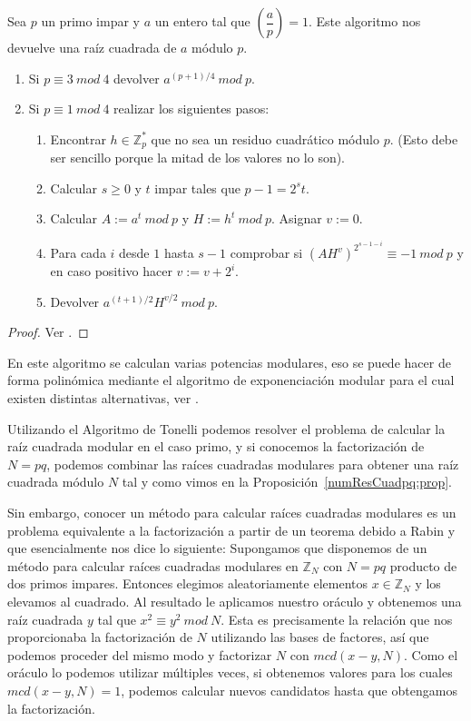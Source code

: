 \begin{algorithm}[Tonelli]
\label{algoTonelli}
Sea $p$ un primo impar y $a$ un entero tal que $\left( \dfrac{a}{p} \right) = 1$.
Este algoritmo nos devuelve una ra\'iz cuadrada de $a$ m\'odulo $p$.
\begin{enumerate}
\item Si $p \equiv 3 ~mod~4$ devolver $a^{(p+1)/4}~mod~p$.
\item Si $p \equiv 1 ~mod~4$ realizar los siguientes pasos:
\begin{enumerate}
\item Encontrar $h \in {\mathbb Z}_p^*$ que no sea un residuo cuadr\'atico m\'odulo $p$. (Esto debe ser sencillo porque la mitad de los valores no lo son).
\item Calcular $s \geq 0$ y $t$ impar tales que $p-1 = 2^s t$.
\item Calcular $A := a^t ~mod~p$ y $H:=h^t~mod~p$. Asignar $v:=0$.
\item Para cada $i$ desde $1$ hasta $s-1$ comprobar si $(AH^v)^{2^{s-1-i}} \equiv -1 ~mod~p$ y en caso positivo hacer $v := v + 2^i$.
\item Devolver $a^{(t+1)/2} H^{v/2} ~mod~p$.
\end{enumerate}
\end{enumerate}
\end{algorithm}
\begin{proof}
Ver \cite[Proposition 2.16]{Pardo}.
\end{proof}

En este algoritmo se calculan varias potencias modulares, eso se puede hacer de forma
polin\'omica mediante el algoritmo de exponenciaci\'on modular para el cual existen
distintas alternativas, ver \cite[Section 2.7.2]{Pardo}.

Utilizando el Algoritmo de Tonelli podemos resolver el problema de calcular
la ra\'iz cuadrada modular en el caso primo, y si conocemos la factorizaci\'on
de $N = pq$, podemos combinar las ra\'ices cuadradas modulares para obtener una
ra\'iz cuadrada m\'odulo $N$ tal y como vimos en la
Proposici\'on~\ref{numResCuadpq:prop}.

Sin embargo, conocer un m\'etodo para calcular ra\'ices cuadradas modulares es un problema
equivalente a la factorizaci\'on a partir de un teorema debido a Rabin y que esencialmente nos
dice lo siguiente: Supongamos que disponemos de un m\'etodo para calcular ra\'ices cuadradas
modulares en ${\mathbb Z}_N$ con $N = pq$ producto de dos primos impares. Entonces elegimos
aleatoriamente elementos $x \in {\mathbb Z}_N$ y los elevamos al cuadrado. Al
resultado le aplicamos nuestro or\'aculo y obtenemos una ra\'iz cuadrada $y$ tal que $x^2
\equiv y^2 ~mod~N$. Esta es precisamente la relaci\'on que nos proporcionaba
la factorizaci\'on de $N$ utilizando las bases de factores, as\'i que podemos proceder del
mismo modo y factorizar $N$ con $mcd(x-y,N)$. Como el or\'aculo lo podemos
utilizar m\'ultiples veces, si obtenemos valores para los cuales $mcd(x-y,N) = 1$, podemos
calcular nuevos candidatos hasta que obtengamos la factorizaci\'on.


